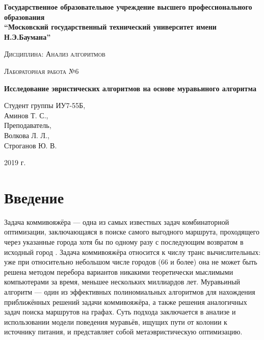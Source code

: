 \documentclass[a4paper,12pt]{report}
\begin{document}
    \begin{titlepage}

        \begin{center}
            \large
            \textbf{Государственное образовательное учреждение высшего профессионального образования\\
            “Московский государственный технический университет имени Н.Э.Баумана”\\}
			\vspace{1cm}
            
            \textsc{Дисциплина: Анализ алгоритмов}
            \vspace{0.5cm}
                
            \textsc{Лабораторная работа №6}
            \vspace{1cm}
            
            {\LARGE \textbf{Исследование эвристических алгоритмов на основе муравьиного алгоритма}}
            \vspace{3cm}
                    
            \begin{flushright}
            	Студент группы ИУ7-55Б,\\   
            	Аминов Т. С.,\\
            	\vspace{0.5cm}
            	Преподаватель,\\
            	Волкова Л. Л.,\\
            	Строганов Ю. В.
            	
            \end{flushright}
            \vfill
            
            2019 г.
            
            \end{center}

    \end{titlepage}

	\setcounter{page}{2}
	\tableofcontents
    \chapter*{Введение}

    	Задача коммивояжёра — одна из самых известных задач комбинаторной оптимизации, заключающаяся в поиске самого выгодного маршрута, проходящего через указанные города хотя бы по одному разу с последующим возвратом в исходный город \cite{commi2}.
    	Задача коммивояжёра относится к числу транс вычислительных: уже при относительно небольшом числе городов (66 и более) она не может быть решена методом перебора вариантов никакими теоретически мыслимыми компьютерами за время, меньшее нескольких миллиардов лет.
    	Муравьиный алгоритм — один из эффективных полиномиальных алгоритмов для нахождения приближённых решений задачи коммивояжёра, а также решения аналогичных задач поиска маршрутов на графах. 
    	Суть подхода заключается в анализе и использовании модели поведения муравьёв, ищущих пути от колонии к источнику питания, и представляет собой метаэвристическую оптимизацию.\\
\end{document}
